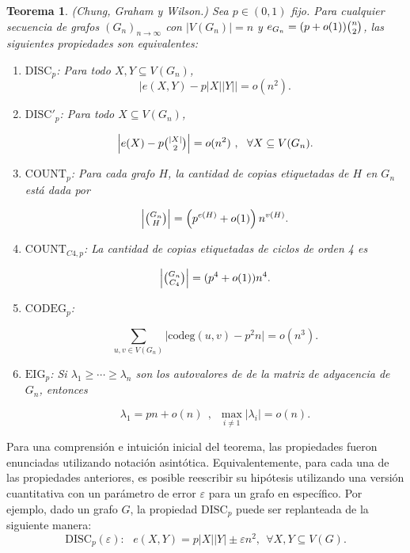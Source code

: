 \documentclass{article}[14pts]
\newtheorem{teorema}{Teorema}
\newcommand{\disc}{\mathrm{DISC}}
\newcommand{\discp}{\mathrm{DISC'}}
\newcommand{\Count}{\mathrm{COUNT}}
\newcommand{\codeg}{\mathrm{CODEG}}
\newcommand{\eig}{\mathrm{EIG}}
\newcommand{\cod}{\mathrm{codeg}}
\let\varepsilon=\varepsilon
\begin{document}
\begin{teorema} \label{Teorema CGW} (Chung, Graham y Wilson.) 
    Sea $p\in (0,1)$ fijo. Para cualquier secuencia de grafos $(G_{n})_{n \to \infty}$ con $|V(G_n)|= n$ y $e_{G_n}= (p + o(1))\tbinom{n}{2}$, las siguientes propiedades son equivalentes:\medskip

    \begin{enumerate}
        \item[\makebox[0.5cm]{$\disc_p$:} Para todo $X,Y\subseteq V(G_n)$,
        \[
            \Big| e(X, Y)- p|X||Y| \Big| = o(n^{2}).
        \]
        
        \item[\makebox[1.0cm]{$\discp_p$:} Para todo $X\subseteq V(G_n)$, 
        
        \[
            \Big| e(X) - p \tbinom{|X|}{2}\Big| = o(n^{2})\ ,\ \ \forall X \subseteq V(G_n).
        \]
        
        \item[\makebox[1.0cm]{$\Count_p$:} Para cada grafo $H$, la cantidad de copias etiquetadas de $H$ en $G_n$ está dada por
        
        \[
            \left|\tbinom{G_n}{H}\right| = \left(p^{e(H)} + o(1)\right) n^{v(H)}.
        \]
        
        \item[\makebox[1.0cm]{$\Count_{C4,p}$:} La cantidad de copias etiquetadas de ciclos de orden 4 es
        
        \[
            \left|\tbinom{G_n}{C_4}\right| = (p^{4} + o(1)) n^{4}.
        \]
        
        \item[\makebox[1.0cm]{$\codeg_p$:} 
        
        \[
            \displaystyle\sum_{u,v\in V(G_n)}\Big| \cod(u,v)-p^{2}n\Big| = o(n^3).
        \]

        \item[\makebox[1.0cm]{$\eig_p$:} Si $\lambda_1 \geq \cdots \geq \lambda_n$ son los autovalores de de la matriz de adyacencia de $G_n$, entonces
        
        \[
            \lambda_1 = pn + o(n)\ \ \text{,}\ \ \ \displaystyle\max_{i\not= 1}|\lambda _{i}| = o(n).
        \]
    \end{enumerate}
\end{teorema}\medskip

Para una comprensión e intuición inicial del teorema, las propiedades fueron enunciadas utilizando notación asintótica. Equivalentemente, para cada una de las propiedades anteriores, es posible reescribir su hipótesis utilizando una versión cuantitativa con un parámetro de error $\varepsilon$ para un grafo en específico. Por ejemplo, dado un grafo $G$, la propiedad $\disc_p$ puede ser replanteada de la siguiente manera:\medskip
\begin{equation*}
  \disc_p(\varepsilon):\ \ \ e(X,Y) = p|X||Y| \pm \varepsilon n^2 , \ \ \forall X,Y \subseteq V(G).  
\end{equation*}
\end{document}
